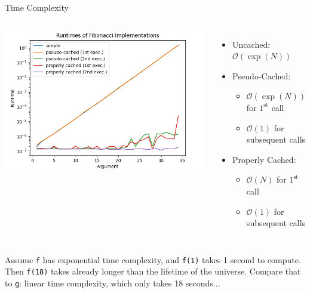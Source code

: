 
\begin{frame}{Time Complexity}
%
\vspace{-3pt}
\begin{columns}
\includegraphics[width=\linewidth]{./gfx/06-cached-fib}
%
\begin{itemize}
\item Uncached: $\mathcal{O}(\exp(N))$
\item Pseudo-Cached: 
	\begin{itemize}
	\item $\mathcal{O}(\exp(N))$ for $1^{\text{st}}$ call
	\item $\mathcal{O}(1)$ for subsequent calls
	\end{itemize}
\item Properly Cached: 
	\begin{itemize}
	\item $\mathcal{O}(N)$ for $1^{\text{st}}$ call
	\item $\mathcal{O}(1)$ for subsequent calls
	\end{itemize}
\end{itemize}
\end{columns}
%
\begin{hintbox}
\footnotesize
Assume \texttt{f} has exponential time complexity, and \texttt{f(1)} takes 1 second to compute. Then \texttt{f(18)} takes already longer than the lifetime of the universe.
Compare that to \texttt{g}: linear time complexity, which only takes 18 seconds...
\end{hintbox}
%
\end{frame}

